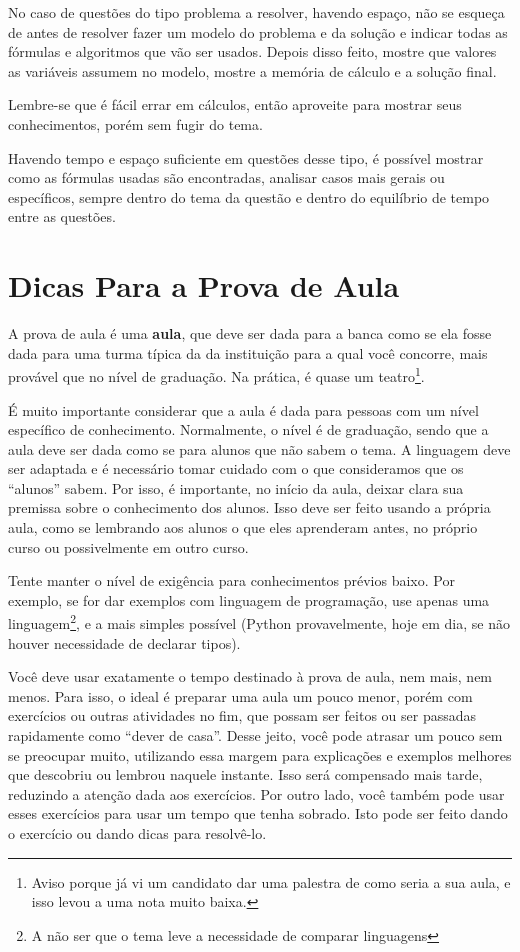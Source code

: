 \documentclass[12pt]{article}
\begin{document}
No caso de questões do tipo problema a resolver, havendo espaço, não se esqueça de antes de resolver fazer um modelo do problema e da solução e indicar todas as fórmulas e algoritmos que vão ser usados.
Depois disso feito, mostre que valores as variáveis assumem no modelo, mostre a memória de cálculo e a solução final.

Lembre-se que é fácil errar em cálculos, então aproveite para mostrar seus conhecimentos, porém sem fugir do tema.

Havendo tempo e espaço suficiente em questões desse tipo, é possível mostrar como as fórmulas usadas são encontradas, analisar casos mais gerais ou específicos, sempre dentro do tema da questão e dentro do equilíbrio de tempo entre as questões.

\section{Dicas Para a Prova de Aula}

A prova de aula é uma \textbf{aula}, que deve ser dada para a banca como se ela fosse dada para uma turma típica da  da instituição para a qual você concorre, mais provável que no nível de graduação. Na prática, é quase um teatro\footnote{Aviso porque já vi um candidato dar uma palestra de como seria a sua aula, e isso levou a uma nota muito baixa.}.

É muito importante considerar que  a aula é dada para pessoas com um nível específico de conhecimento. Normalmente, o nível é de graduação, sendo que a aula deve ser dada como se para alunos que não sabem o tema. A linguagem deve ser adaptada e é necessário tomar cuidado com o que consideramos que os ``alunos'' sabem. Por isso, é importante, no início da aula, deixar clara sua premissa sobre o conhecimento dos alunos. Isso deve ser feito usando a própria aula, como se lembrando aos alunos o que eles aprenderam antes, no próprio curso ou possivelmente em outro curso.

Tente manter o nível de exigência para conhecimentos prévios baixo. Por exemplo, se for dar exemplos com linguagem de programação, use apenas uma linguagem\footnote{A não ser que o tema leve a necessidade de comparar linguagens}, e a mais simples possível (Python provavelmente, hoje em dia, se não houver necessidade de declarar tipos).

Você deve usar exatamente o tempo destinado à prova de aula, nem mais, nem menos. Para isso, o ideal é preparar uma aula um pouco menor, porém com exercícios ou outras atividades no fim, que possam ser feitos ou ser passadas rapidamente como ``dever de casa''.
Desse jeito, você pode atrasar um pouco sem se preocupar muito, utilizando essa margem para explicações e exemplos melhores que descobriu ou lembrou naquele instante. Isso será compensado mais tarde, reduzindo a atenção dada aos exercícios.
Por outro lado, você também pode usar esses exercícios para usar um tempo que tenha sobrado. Isto pode ser feito dando o exercício ou dando dicas para resolvê-lo.
\end{document}
